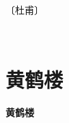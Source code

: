 \documentclass[12pt,UTF-8,openany,fontset=none]{ctexbook}
\begin{document}
\begin{center}
    \vspace{10pt}
    
    \begin{large}
        
        〔杜甫〕
        
    \end{large}
    
    \vspace{8pt}
    
    \begin{huge}
        
        \phantom{。}

        \phantom{。}
        
        \phantom{。}

        \phantom{。}
        
        \phantom{。}~~

        \phantom{。}
        
        \phantom{。}

        \phantom{。}
        
    \end{huge}
    
\end{center}

\vspace{8pt}
\clearpage

\section{黄鹤楼}



\begin{center}
    {\bfseries 黄鹤楼}
\end{center}
\end{document}
